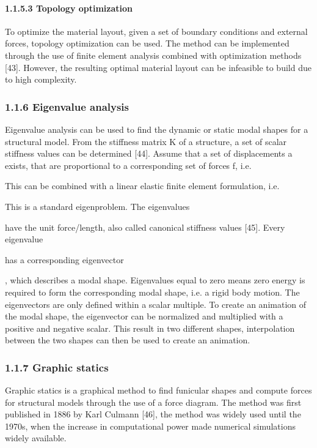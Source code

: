 \paragraph[1.1.5.3 Topology optimization]{1.1.5.3 Topology optimization}
To optimize the material layout, given a set of boundary conditions and external forces, topology optimization can be used. The method can be implemented through the use of finite element analysis combined with optimization methods [43]. However, the resulting optimal material layout can be infeasible to build due to high complexity.

\subsubsection[1.1.6 Eigenvalue analysis]{1.1.6 Eigenvalue analysis}
Eigenvalue analysis can be used to find the dynamic or static modal shapes for a structural model. From the stiffness matrix K of a structure, a set of scalar stiffness values can be determined [44]. Assume that a set of displacements a exists, that are proportional to a corresponding set of forces f, i.e.


This can be combined with a linear elastic finite element formulation, i.e.

This is a standard eigenproblem. The eigenvalues   

 have the unit force/length, also called canonical stiffness values [45]. Every eigenvalue  

 has a corresponding eigenvector   

 , which describes a modal shape. Eigenvalues equal to zero means zero energy is required to form the corresponding modal shape, i.e. a rigid body motion. The eigenvectors are only defined within a scalar multiple. To create an animation of the modal shape, the eigenvector can be normalized and multiplied with a positive and negative scalar. This result in two different shapes, interpolation between the two shapes can then be used to create an animation.



\subsubsection[1.1.7 Graphic statics]{1.1.7 Graphic statics}
Graphic statics is a graphical method to find funicular shapes and compute forces for structural models through the use of a force diagram. The method was first published in 1886 by Karl Culmann [46], the method was widely used until the 1970s, when the increase in computational power made numerical simulations widely available. 



